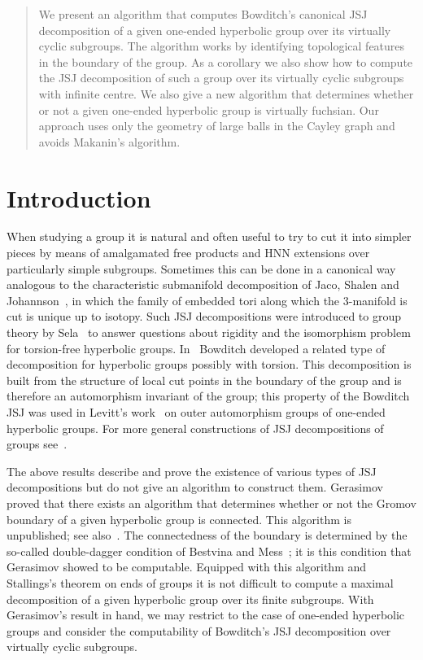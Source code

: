 \begin{abstract} We present an algorithm that computes Bowditch's canonical JSJ
decomposition of a given one-ended hyperbolic group over its virtually cyclic
subgroups. The algorithm works by identifying topological features in the boundary
of the group. As a corollary we also show how to compute the JSJ
decomposition of such a group over its virtually cyclic subgroups with
infinite centre. We also give a new algorithm that determines whether or not a
given one-ended hyperbolic group is virtually fuchsian. Our approach uses only
the geometry of large balls in the Cayley graph and avoids Makanin's
algorithm.\end{abstract}

\section{Introduction}

When studying a group it is natural and often useful to try to cut it into
simpler pieces by means of amalgamated free products and HNN extensions over
particularly simple subgroups. Sometimes this can be done in a canonical way
analogous to the characteristic submanifold decomposition of Jaco, Shalen and
Johannson~\cite{jacoshalen79, johannson79}, in which the family of embedded
tori along which the 3-manifold is cut is unique up to isotopy. Such JSJ
decompositions were introduced to group theory by Sela~\cite{sela97} to answer
questions about rigidity and the isomorphism problem for torsion-free
hyperbolic groups. In~\cite{bowditch98} Bowditch developed a related type of
decomposition for hyperbolic groups possibly with torsion. This decomposition
is built from the structure of local cut points in the boundary of the group
and is therefore an automorphism invariant of the group; this property of the
Bowditch JSJ was used in Levitt's work~\cite{levitt05} on outer automorphism
groups of one-ended hyperbolic groups. For more general constructions of JSJ
decompositions of groups see~\cite{ripssela97, dunwoodysageev99,
fujiwarapapsoglu06, guirardellevitt16}.

The above results describe and prove the existence of various types of JSJ
decompositions but do not give an algorithm to construct them.
Gerasimov~\cite{gerasimov} proved that there exists an algorithm that
determines whether or not the Gromov boundary of a given hyperbolic group is
connected. This algorithm is unpublished; see also~\cite{dahmanigroves08a}. The
connectedness of the boundary is determined by the so-called double-dagger
condition of Bestvina and Mess~\cite{bestvinamess91}; it is this condition that
Gerasimov showed to be computable. Equipped with this algorithm and Stallings's
theorem on ends of groups it is not difficult to compute a maximal decomposition of
a given hyperbolic group over its finite subgroups. With Gerasimov's result in
hand, we may restrict to the case of one-ended hyperbolic groups and consider
the computability of Bowditch's JSJ decomposition over virtually cyclic
subgroups. 

